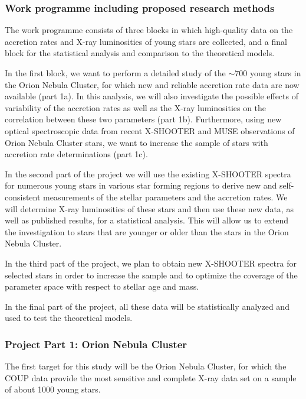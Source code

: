 \documentclass[10pt,fleqn,twoside]{article}
\begin{document}
\subsubsection{Work programme including proposed research methods}

The work programme consists of three blocks in which high-quality data
on the accretion rates and X-ray luminosities of young stars are collected,
and a final block for the statistical analysis and
comparison to the theoretical models.

In the first block, we want to perform a detailed study
of the $\sim 700$ young stars in the Orion Nebula Cluster, for which
 new and reliable  accretion rate data are now available (part 1a).
%
In this analysis, we will also investigate the possible effects of variability
of the accretion rates as well as the X-ray luminosities
on the correlation between these two parameters (part 1b).
%
Furthermore, using new optical spectroscopic data from recent X-SHOOTER 
and MUSE observations of Orion Nebula Cluster stars,
we want to increase the sample of stars with accretion rate
determinations (part 1c).
\medskip

In the second part of the project we will use the existing X-SHOOTER spectra for
numerous young stars
in various star forming regions to derive new and self-consistent 
measurements of the
stellar parameters and the accretion rates. 
We will determine X-ray luminosities of these stars and then
use these new data,
as well as published results, for a  statistical analysis.
This will allow us to extend the investigation to stars that are
younger or older than the stars in the Orion Nebula Cluster.


\smallskip

In the third part of the project, we plan to obtain new 
X-SHOOTER spectra for selected stars in order to increase the sample
and to optimize the coverage of the parameter space with respect
to stellar age and mass.

\smallskip

In the final part of the project,
all these data will be statistically analyzed and
used to test the theoretical models.


\subsubsection*{Project Part 1: Orion Nebula Cluster}



The first target for this study will be the Orion Nebula Cluster,
for which the COUP data provide the most sensitive and complete
X-ray data set on a sample of about 1000 young stars.
\end{document}
